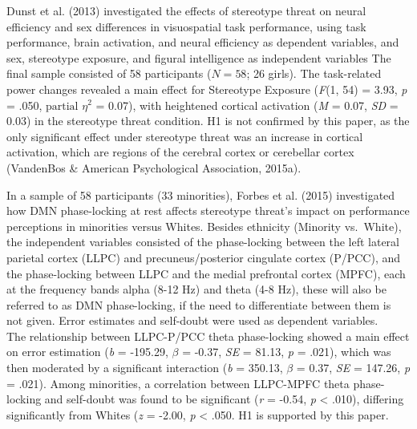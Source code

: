 \documentclass[
  stu, a4paper, 12pt,mask,floatsintext]{apa7}
\begin{document}
Dunst et al. (2013) investigated the effects of stereotype threat on neural efficiency and sex differences in visuospatial task performance, using task performance, brain activation, and neural efficiency as dependent variables, and sex, stereotype exposure, and figural intelligence as independent variables
The final sample consisted of 58 participants (\(N = 58\); 26 girls).
The task-related power changes revealed a main effect for Stereotype Exposure (\emph{F}(1, 54) = 3.93, \emph{p} = .050, \(\text{partial }\eta^{2}\) = 0.07), with heightened cortical activation (\emph{M} = 0.07, \emph{SD} = 0.03) in the stereotype threat condition.
H1 is not confirmed by this paper, as the only significant effect under stereotype threat was an increase in cortical activation, which are regions of the cerebral cortex or cerebellar cortex (VandenBos \& American Psychological Association, 2015a).

In a sample of 58 participants (33 minorities), Forbes et al. (2015) investigated how DMN phase-locking at rest affects stereotype threat's impact on performance perceptions in minorities versus Whites.
Besides ethnicity (Minority vs.~White), the independent variables consisted of the phase-locking between the left lateral parietal cortex (LLPC) and precuneus/posterior cingulate cortex (P/PCC), and the phase-locking between LLPC and the medial prefrontal cortex (MPFC), each at the frequency bands alpha (8-12 Hz) and theta (4-8 Hz), these will also be referred to as DMN phase-locking, if the need to differentiate between them is not given.
Error estimates and self-doubt were used as dependent variables.\\
The relationship between LLPC-P/PCC theta phase-locking showed a main effect on error estimation (\emph{b} = -195.29, \(\beta\) = -0.37, \emph{SE} = 81.13, \emph{p} = .021), which was then moderated by a significant interaction (\emph{b} = 350.13, \(\beta\) = 0.37, \emph{SE} = 147.26, \emph{p} = .021).
Among minorities, a correlation between LLPC-MPFC theta phase-locking and self-doubt was found to be significant (\emph{r} = -0.54, \emph{p} \textless{} .010), differing significantly from Whites (\emph{z} = -2.00, \emph{p} \textless{} .050.
H1 is supported by this paper.
\end{document}
